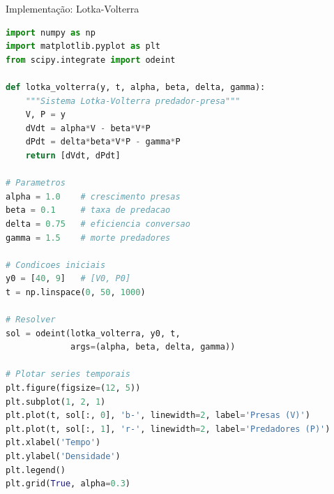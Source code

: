 \begin{frame}[fragile]{Implementação: Lotka-Volterra}
\begin{lstlisting}[language=Python, caption=Sistema predador-presa]
import numpy as np
import matplotlib.pyplot as plt
from scipy.integrate import odeint

def lotka_volterra(y, t, alpha, beta, delta, gamma):
    """Sistema Lotka-Volterra predador-presa"""
    V, P = y
    dVdt = alpha*V - beta*V*P
    dPdt = delta*beta*V*P - gamma*P
    return [dVdt, dPdt]

# Parametros
alpha = 1.0    # crescimento presas
beta = 0.1     # taxa de predacao
delta = 0.75   # eficiencia conversao
gamma = 1.5    # morte predadores

# Condicoes iniciais
y0 = [40, 9]   # [V0, P0]
t = np.linspace(0, 50, 1000)

# Resolver
sol = odeint(lotka_volterra, y0, t,
             args=(alpha, beta, delta, gamma))

# Plotar series temporais
plt.figure(figsize=(12, 5))
plt.subplot(1, 2, 1)
plt.plot(t, sol[:, 0], 'b-', linewidth=2, label='Presas (V)')
plt.plot(t, sol[:, 1], 'r-', linewidth=2, label='Predadores (P)')
plt.xlabel('Tempo')
plt.ylabel('Densidade')
plt.legend()
plt.grid(True, alpha=0.3)
\end{lstlisting}
\end{frame}

